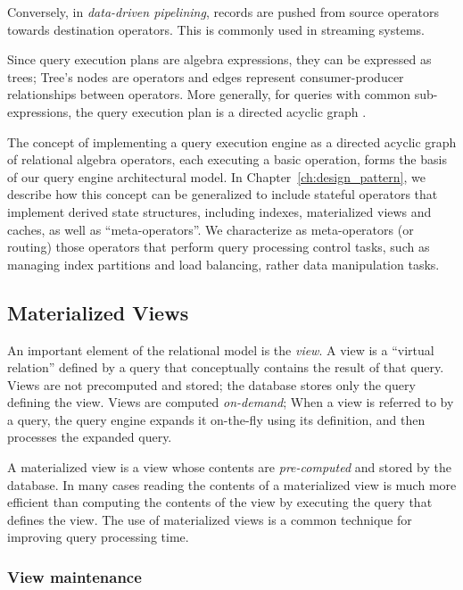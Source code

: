 Conversely, in \textit{data-driven pipelining}, records are pushed from source operators towards destination operators.
This is commonly used in streaming systems.

Since query execution plans are algebra expressions, they can be expressed as trees;
Tree's nodes are operators and edges represent consumer-producer relationships between operators.
More generally, for queries with common sub-expressions,
the query execution plan is a directed acyclic graph \cite{graefe:queryevaluation}.


\bigskip
\noindent
The concept of implementing a query execution engine as a directed acyclic graph of relational algebra operators,
each executing a basic operation, forms the basis of our query engine architectural model.
In Chapter~\ref{ch:design_pattern}, we describe how this concept can be generalized to include
stateful operators that implement derived state structures, including indexes, materialized views and caches,
as well as  ``meta-operators''.
We characterize as meta-operators (or routing) those operators that perform query processing control tasks,
such as managing index partitions and load balancing, rather data manipulation tasks.

\subsection{Materialized Views}
\label{sec:materialize_views}
An important element of the relational model is the \textit{view}.
A view is a ``virtual relation'' defined by a query that conceptually contains the result of that query.
Views are not precomputed and stored; the database stores only the query defining the view.
Views are computed \textit{on-demand};
When a view is referred to by a query, the query engine expands it on-the-fly using its definition,
and then processes the expanded query.

A materialized view is a view whose contents are \textit{pre-computed} and stored by the database.
In many cases reading the contents of a materialized view is much more efficient than computing the contents of the view
by executing the query that defines the view.
The use of materialized views is a common technique for improving query processing time.

\subsubsection{View maintenance}

